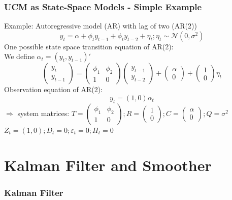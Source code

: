 \documentclass{beamer}
\begin{document}
\begin{frame}[t]\frametitle{UCM as State-Space Models - Simple Example}
Example: Autoregressive model (AR) with lag of two (AR(2))\\
\[
y_{t} = \alpha + \phi_{t}y_{t-1} + \phi_{t}y_{t-2} + \eta_{t}; \eta_{t} \sim \mathcal{N}(0,\sigma^{2})
\]
One possible state space transition equation of AR(2):\\
\hspace{50pt} We define $\alpha_{t} = (y_{t}, y_{t-1})'$
\begin{equation*}
\begin{pmatrix}
y_{t}\\
y_{t-1}
\end{pmatrix}
=
\begin{pmatrix}
\phi_{1} & \phi_{2}\\
1 & 0
\end{pmatrix}
\begin{pmatrix}
y_{t-1} \\
y_{t-2}
\end{pmatrix}
+
\begin{pmatrix}
\alpha\\
0
\end{pmatrix}
+
\begin{pmatrix}
1\\
0
\end{pmatrix}
\eta_{t}
\end{equation*}
Observation equation of AR(2):
\begin{equation*}
y_{t} 
= (1,0)\alpha_{t}
\end{equation*}
$\Rightarrow$ system matrices: $T=\begin{pmatrix}
\phi_{1} & \phi_{2}\\
1 & 0
\end{pmatrix}; R=\begin{pmatrix}
1\\
0
\end{pmatrix}; C=\begin{pmatrix}
\alpha\\
0
\end{pmatrix}; Q=\sigma^{2}$ \\
\hspace{90pt} $Z_{t} = (1,0); D_{t}=0;\varepsilon_{t}=0;H_{t}=0$
\end{frame}

\section{Kalman Filter and Smoother}
\begin{frame}\frametitle{Kalman Filter}

\end{frame}
\end{document}
